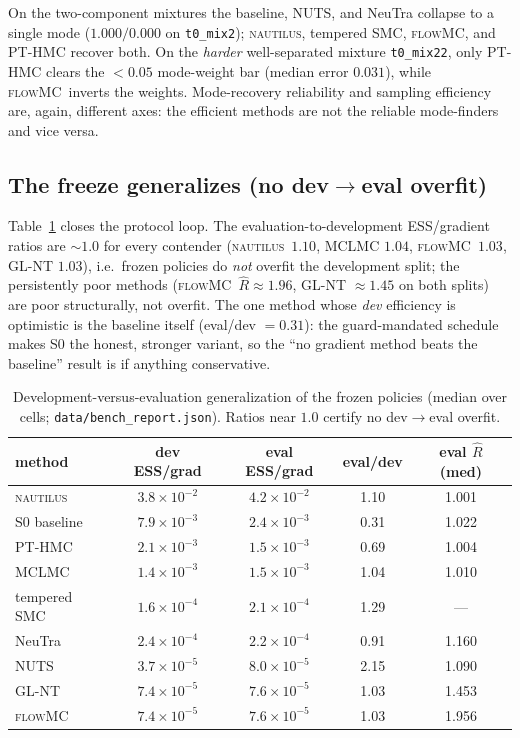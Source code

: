 \documentclass[11pt,letterpaper]{article}
\newcommand{\Rhat}{\ensuremath{\hat{R}}}
\newcommand{\nautilus}{\textsc{nautilus}}
\newcommand{\flowmc}{\textsc{flowMC}}
\newcommand{\dfile}[1]{\texttt{#1}}
\begin{document}
On the two-component mixtures the baseline, NUTS, and NeuTra collapse to a
single mode ($1.000/0.000$ on \dfile{t0\_mix2}); \nautilus, tempered SMC,
\flowmc, and PT-HMC recover both. On the {\it harder} well-separated mixture
\dfile{t0\_mix22}, only PT-HMC clears the $<0.05$ mode-weight bar (median error
$0.031$), while \flowmc\ inverts the weights. Mode-recovery reliability and
sampling efficiency are, again, different axes: the efficient methods are not
the reliable mode-finders and vice versa.

\subsection{The freeze generalizes (no dev$\to$eval overfit)}

Table~\ref{tab:deveval} closes the protocol loop. The evaluation-to-development
ESS/gradient ratios are $\sim$$1.0$ for every contender (\nautilus\ $1.10$, MCLMC
$1.04$, \flowmc\ $1.03$, GL-NT $1.03$), i.e.\ frozen policies do {\it not}
overfit the development split; the persistently poor methods (\flowmc\ $\Rhat\approx
1.96$, GL-NT $\approx1.45$ on both splits) are poor structurally, not overfit.
The one method whose {\it dev} efficiency is optimistic is the baseline itself
(eval/dev $=0.31$): the guard-mandated schedule makes S0 the honest, stronger
variant, so the ``no gradient method beats the baseline'' result is if anything
conservative.

\begin{table}[ht]
\centering
\caption{Development-versus-evaluation generalization of the frozen policies
(median over cells; \dfile{data/bench\_report.json}). Ratios near $1.0$ certify
no dev$\to$eval overfit.}
\label{tab:deveval}
\begin{tabular}{lcccc}
\toprule
method & dev ESS/grad & eval ESS/grad & eval/dev & eval $\Rhat$ (med) \\
\midrule
\nautilus       & $3.8\!\times\!10^{-2}$ & $4.2\!\times\!10^{-2}$ & 1.10 & 1.001 \\
S0 baseline     & $7.9\!\times\!10^{-3}$ & $2.4\!\times\!10^{-3}$ & 0.31 & 1.022 \\
PT-HMC          & $2.1\!\times\!10^{-3}$ & $1.5\!\times\!10^{-3}$ & 0.69 & 1.004 \\
MCLMC           & $1.4\!\times\!10^{-3}$ & $1.5\!\times\!10^{-3}$ & 1.04 & 1.010 \\
tempered SMC    & $1.6\!\times\!10^{-4}$ & $2.1\!\times\!10^{-4}$ & 1.29 & --- \\
NeuTra          & $2.4\!\times\!10^{-4}$ & $2.2\!\times\!10^{-4}$ & 0.91 & 1.160 \\
NUTS            & $3.7\!\times\!10^{-5}$ & $8.0\!\times\!10^{-5}$ & 2.15 & 1.090 \\
GL-NT           & $7.4\!\times\!10^{-5}$ & $7.6\!\times\!10^{-5}$ & 1.03 & 1.453 \\
\flowmc         & $7.4\!\times\!10^{-5}$ & $7.6\!\times\!10^{-5}$ & 1.03 & 1.956 \\
\bottomrule
\end{tabular}
\end{table}
\end{document}
